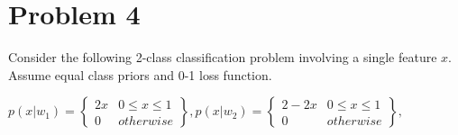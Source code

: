 \documentclass[12pt]{article}
\begin{document}
\section{Problem 4}
Consider the following 2-class classification problem involving a single feature $x$.
Assume equal class priors and 0-1 loss function.
\begin{center}
$
p(x|w_1) = \left\lbrace \begin{matrix}
2x & 0 \leq x \leq 1 \\
0 & otherwise
\end{matrix} \right\rbrace,
p(x|w_2) = \left\lbrace \begin{matrix}
2 - 2x & 0 \leq x \leq 1 \\
0 & otherwise
\end{matrix} \right\rbrace,
$
\end{center}
\end{document}
